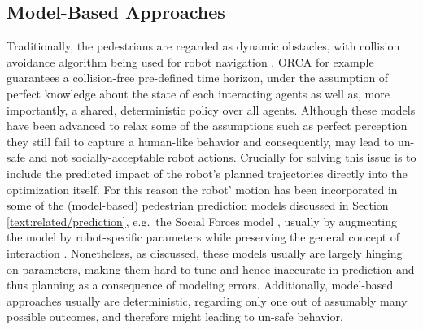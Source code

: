 \subsection{Model-Based Approaches}
Traditionally, the pedestrians are regarded as dynamic obstacles, with collision avoidance algorithm being used for robot navigation \cite{vandenBerg2011}\cite{Fox1997}\cite{Luo2018a}\cite{Phillips2011}. \ac{ORCA} \cite{vandenBerg2011} for example guarantees a collision-free pre-defined time horizon, under the assumption of perfect knowledge about the state of each interacting agents as well as, more importantly, a shared, deterministic policy over all agents. Although these models have been advanced to relax some of the assumptions such as perfect perception \cite{Hennes2012} they still fail to capture a human-like behavior and consequently, may lead to un-safe and not socially-acceptable robot actions. Crucially for solving this issue is to include the predicted impact of the robot's planned trajectories directly into the optimization itself. For this reason the robot' motion has been incorporated in some of the (model-based) pedestrian prediction models discussed in Section \ref{text:related/prediction}, e.g.\ the Social Forces model \cite{Helbing1995}, usually by augmenting the model by robot-specific parameters while preserving the general concept of interaction \cite{Ferrer2013}\cite{Luo2018a}. Nonetheless, as discussed, these models usually are largely hinging on parameters, making them hard to tune and hence inaccurate in prediction and thus planning as a consequence of modeling errors. Additionally, model-based approaches usually are deterministic, regarding only one out of assumably many possible outcomes, and therefore might leading to un-safe behavior.


